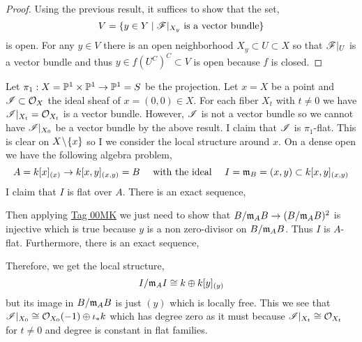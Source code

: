 \documentclass[12pt]{article}
\begin{document}
\begin{proof}
Using the previous result, it suffices to show that the set,
\[ V = \{ y \in Y \mid \F|_{X_y} \text{ is a vector bundle} \} \]
is open. For any $y \in V$ there is an open neighborhood $X_y \subset U \subset X$ so that $\F|_U$ is a vector bundle and thus $y \in f(U^C)^C \subset V$ is open because $f$ is closed.
\end{proof}

\begin{example}
Let $\pi_1 : X = \P^1 \times \P^1 \to \P^1 = S$ be the projection. Let $x = X$ be a point and $\I \subset \struct{X}$ the ideal sheaf of $x = (0,0) \in X$. For each fiber $X_t$ with $t \neq 0$ we have $\I|_{X_t} = \struct{X_t}$ is a vector bundle. However, $\I$ is not a vector bundle so we cannot have $\I|_{X_0}$ be a vector bundle by the above result. I claim that $\I$ is $\pi_1$-flat. This is clear on $X \sm \{ x \}$ so I we consider the local structure around $x$. On a dense open we have the following algebra problem,
\[ A = k[x]_{(x)} \to k[x,y]_{(x,y)} = B \quad \text{ with the ideal } \quad I = \m_B = (x,y) \subset k[x,y]_{(x,y)} \]
I claim that $I$ is flat over $A$. There is an exact sequence,
\begin{center}
\end{center}
Then applying \href{https://stacks.math.columbia.edu/tag/00MK}{Tag 00MK} we just need to show that $B/\m_A B \to (B / \m_A B)^2$ is injective which is true because $y$ is a non zero-divisor on $B / \m_A B$. Thus $I$ is $A$-flat. Furthermore, there is an exact sequence,
\begin{center}
\end{center}
Therefore, we get the local structure,
\[ I / \m_A I \cong k \oplus k[y]_{(y)} \]
but its image in $B / \m_A B$ is just $(y)$ which is locally free. This we see that $\I|_{X_0} \cong \struct{X_0}(-1) \oplus \iota_* k$ which has degree zero as it must because $\I|_{X_t} \cong \struct{X_t}$ for $t \neq 0$ and degree is constant in flat families.
\end{example}
\end{document}
